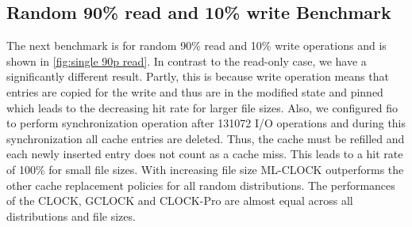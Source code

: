 \documentclass[
	12pt,
	a4paper,
	abstract,
	bibliography=totoc,
	chapterprefix,
	headings=openright,
	numbers=endperiod,
	parskip=half,
	twoside,
]{scrreprt}
\begin{document}
\newpage
\subsection{Random 90\% read and 10\% write Benchmark}

The next benchmark is for random 90\% read and 10\% write operations
and is shown in \cref{fig:single 90p read}.
In contrast to the read-only case, we have a significantly different result.
Partly, this is because write operation means that entries are copied for the write and thus are in the modified state and pinned
which leads to the decreasing hit rate for larger file sizes.
Also, we configured fio to perform synchronization operation after 131072 I/O operations and during this 
synchronization all cache entries are deleted.
Thus, the cache must be refilled and each newly inserted entry does not count as a cache miss.
This leads to a hit rate of 100\% for small file sizes.
With increasing file size ML-CLOCK outperforms the other cache replacement policies for all random distributions.
The performances of the CLOCK, GCLOCK and CLOCK-Pro are almost equal across all distributions and file sizes.
\end{document}
